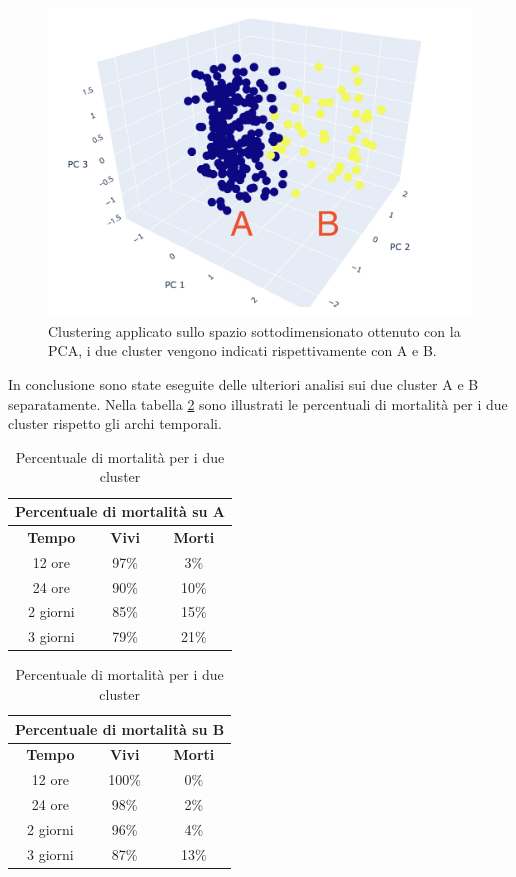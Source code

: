 \begin{figure}[h]
	\centering
	\includegraphics[width=14cm]{capitolo3/kmean.png}
	\caption{Clustering applicato sullo spazio sottodimensionato ottenuto con la PCA, i due cluster vengono indicati rispettivamente con A e B. }
	\label{fig:kmean}
\end{figure}

\newpage
In conclusione sono state eseguite delle ulteriori analisi sui due cluster A e B separatamente.
Nella tabella \ref{table:cluster1} sono illustrati le percentuali di mortalità per i due cluster rispetto gli archi temporali.

\begin{table}[h!]

	\parbox{.45\textwidth}{
	\centering
	\begin{tabular}{ |c| c|c|} 
		\hline
		\multicolumn{3}{|c|}{Percentuale di mortalità su A} \\
		\hline
		\textbf{Tempo} & \textbf{Vivi} & \textbf{Morti} \\
		\hline
		\hline
		12 ore & 97\% & 3\% \\
		\hline
		24 ore & 90\% & 10\% \\
		\hline 
		2 giorni & 85\% & 15\% \\
		\hline
		3 giorni & 79\% & 21\% \\
		\hline
	\end{tabular}}
	\quad
	\parbox{.45\textwidth}{
		\centering
		\begin{tabular}{ |c| c|c|} 
			\hline
			\multicolumn{3}{|c|}{Percentuale di mortalità su B} \\
			\hline
			\textbf{Tempo} & \textbf{Vivi} & \textbf{Morti} \\
			\hline
			\hline
			12 ore & 100\% & 0\% \\
			\hline
			24 ore & 98\% & 2\% \\
			\hline 
			2 giorni & 96\% & 4\% \\
			\hline
			3 giorni & 87\% & 13\% \\
			\hline
	\end{tabular}}
	\caption{Percentuale di mortalità per i due cluster}
	\label{table:cluster1}
\end{table}

